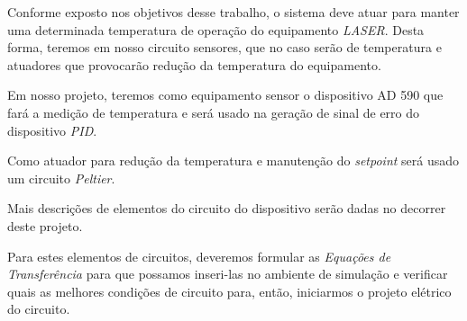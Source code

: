 \par Conforme exposto nos objetivos desse trabalho, o sistema deve atuar para manter uma determinada temperatura de operação do equipamento \emph{LASER}. Desta forma, teremos em nosso circuito sensores, que no caso serão de temperatura e atuadores que provocarão redução da temperatura do equipamento. 

Em nosso projeto, teremos como equipamento sensor o dispositivo AD 590 que fará a medição de temperatura e será usado na geração de sinal de erro do dispositivo \emph{PID}. 

Como atuador para redução da temperatura e manutenção do \emph{setpoint} será usado um circuito \emph{Peltier}. 

Mais descrições de elementos do circuito do dispositivo serão dadas no decorrer deste projeto. 

Para estes elementos de circuitos, deveremos formular as \emph{Equações de Transferência} para que possamos inseri-las no ambiente de simulação e verificar quais as melhores condições de circuito para, então, iniciarmos o projeto elétrico do circuito.
